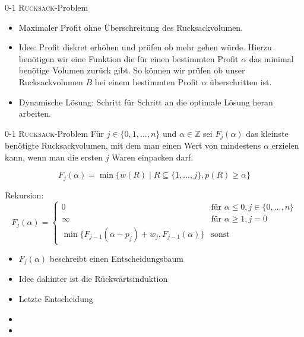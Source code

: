 \begin{frame}{0-1 \textsc{Rucksack}-Problem}
\begin{itemize}
	\item Maximaler Profit ohne Überschreitung des Rucksackvolumen.
    \item Idee: Profit diskret erhöhen und prüfen ob mehr gehen würde.
    Hierzu benötigen wir eine Funktion die für einen bestimmten Profit $\alpha$ das minimal benötige Volumen zurück gibt.
    So können wir prüfen ob unser Rucksackvolumen $B$ bei einem bestimmten Profit $\alpha$ überschritten ist.
    
    \item Dynamische Lösung: Schritt für Schritt an die optimale Lösung heran arbeiten.
\end{itemize}
\end{frame}
\begin{frame}{0-1 \textsc{Rucksack}-Problem}
    Für $j \in \{0,1,...,n\}$ und $\alpha \in \mathbb{Z}$ sei $F_j(\alpha)$ das kleinste benötigte Rucksackvolumen, mit dem
    man einen Wert von mindestens $\alpha$ erzielen kann, wenn man die ersten $j$ Waren einpacken darf. 
    
    \begin{equation*}
        F_j(\alpha) = \min\{w(R) \mid R \subseteq \{1,...,j\}, p(R) \geq \alpha  \}
    \end{equation*}
    
    Rekursion:
    \begin{equation*}
        F_j(\alpha) = \begin{cases}
        0 & \text{für } \alpha\leq 0, j \in \{0,...,n \} \\
        \infty & \text{für } \alpha\geq 1, j = 0 \\
        \min\{F_{j-1}(\alpha-p_j) + w_j, F_{j-1}(\alpha) \} & \text{sonst}
        \end{cases}       
    \end{equation*}
\end{frame}

\begin{frame}
    \begin{itemize}
        \item $F_j(\alpha)$ beschreibt einen Entscheidungsbaum
        \item Idee dahinter ist die Rückwärtsinduktion
        \item Letzte Entscheidung 
        \item 
        \item 
    \end{itemize}
\end{frame}

